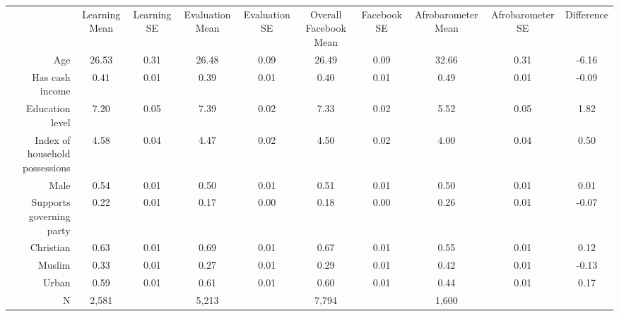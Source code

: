 
\begin{tabular}[t]{rcccc|ccccc}
 & Learning Mean & Learning SE & Evaluation Mean & Evaluation SE & Overall Facebook Mean & Facebook SE & Afrobarometer Mean & Afrobarometer SE & Difference\\
\cmidrule(lr){2-2}  \cmidrule(lr){3-3}  \cmidrule(lr){4-4} \cmidrule(lr){5-5} \cmidrule(lr){6-6} \cmidrule(lr){7-7} \cmidrule(lr){8-8} \cmidrule(lr){9-9} \cmidrule(lr){10-10}
Age & 26.53 & 0.31 & 26.48 & 0.09 & 26.49 & 0.09 & 32.66 & 0.31 & -6.16\\
Has cash income & 0.41 & 0.01 & 0.39 & 0.01 & 0.40 & 0.01 & 0.49 & 0.01 & -0.09\\
Education level & 7.20 & 0.05 & 7.39 & 0.02 & 7.33 & 0.02 & 5.52 & 0.05 & 1.82\\
Index of household possessions & 4.58 & 0.04 & 4.47 & 0.02 & 4.50 & 0.02 & 4.00 & 0.04 & 0.50\\
Male & 0.54 & 0.01 & 0.50 & 0.01 & 0.51 & 0.01 & 0.50 & 0.01 & 0.01\\
Supports governing party & 0.22 & 0.01 & 0.17 & 0.00 & 0.18 & 0.00 & 0.26 & 0.01 & -0.07\\
Christian & 0.63 & 0.01 & 0.69 & 0.01 & 0.67 & 0.01 & 0.55 & 0.01 & 0.12\\
Muslim & 0.33 & 0.01 & 0.27 & 0.01 & 0.29 & 0.01 & 0.42 & 0.01 & -0.13\\
Urban & 0.59 & 0.01 & 0.61 & 0.01 & 0.60 & 0.01 & 0.44 & 0.01 & 0.17\\
N & 2,581 &   & 5,213 &   & 7,794 &  & 1,600 &   &  
\end{tabular}
